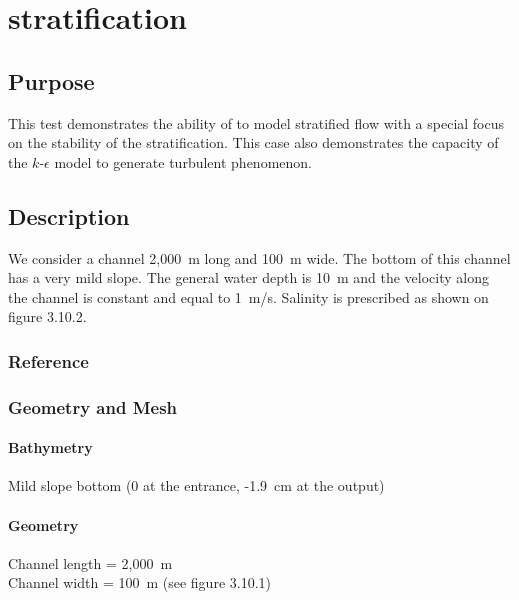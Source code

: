 \chapter{stratification}
%
%
\section{Purpose}
%
This test demonstrates the ability of  to model stratified
flow with a special focus on the stability of the stratification.
This case also demonstrates the capacity of the $k$-$\epsilon$ model
to generate turbulent phenomenon.
%
\section{Description}
%
We consider a channel 2,000~m long and 100~m wide.
The bottom of this channel has a very mild slope.
The general water depth is 10~m and the velocity along the channel is
constant and equal to 1~m/s.
Salinity is prescribed as shown on figure 3.10.2.
%
%
%
%
\subsection{Reference}
%

%
%
%
\subsection{Geometry and Mesh}
%
\subsubsection{Bathymetry}
%
Mild slope bottom (0 at the entrance, -1.9~cm at the output)
%
\subsubsection{Geometry}
%
Channel length = 2,000~m\\
Channel width = 100~m (see figure 3.10.1)
%
